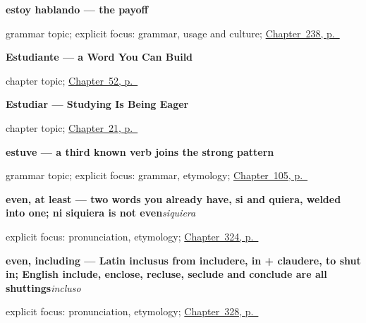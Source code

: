 \noindent\begin{minipage}[t]{\linewidth}
\raggedright
\textbf{estoy hablando — the payoff}\par
\footnotesize grammar topic; explicit focus: grammar, usage and culture; \hyperref[ch:estoy-hablando]{Chapter~238, p.~\pageref*{ch:estoy-hablando}}
\end{minipage}\par\smallskip

\noindent\begin{minipage}[t]{\linewidth}
\raggedright
\textbf{Estudiante --- a Word You Can Build}\par
\footnotesize chapter topic; \hyperref[ch:estudiante]{Chapter~52, p.~\pageref*{ch:estudiante}}
\end{minipage}\par\smallskip

\noindent\begin{minipage}[t]{\linewidth}
\raggedright
\textbf{Estudiar --- Studying Is Being Eager}\par
\footnotesize chapter topic; \hyperref[ch:spanish-estudiar]{Chapter~21, p.~\pageref*{ch:spanish-estudiar}}
\end{minipage}\par\smallskip

\noindent\begin{minipage}[t]{\linewidth}
\raggedright
\textbf{estuve — a third known verb joins the strong pattern}\par
\footnotesize grammar topic; explicit focus: grammar, etymology; \hyperref[ch:spanish-preterito-fuerte]{Chapter~105, p.~\pageref*{ch:spanish-preterito-fuerte}}
\end{minipage}\par\smallskip

\noindent\begin{minipage}[t]{\linewidth}
\raggedright
\textbf{even, at least — two words you already have, si and quiera, welded into one; ni siquiera is not even}\enspace\emph{siquiera}\par
\footnotesize explicit focus: pronunciation, etymology; \hyperref[ch:verdad-y-siquiera]{Chapter~324, p.~\pageref*{ch:verdad-y-siquiera}}
\end{minipage}\par\smallskip

\noindent\begin{minipage}[t]{\linewidth}
\raggedright
\textbf{even, including — Latin inclusus from includere, in + claudere, to shut in; English include, enclose, recluse, seclude and conclude are all shuttings}\enspace\emph{incluso}\par
\footnotesize explicit focus: pronunciation, etymology; \hyperref[ch:asi-y-incluso]{Chapter~328, p.~\pageref*{ch:asi-y-incluso}}
\end{minipage}\par\smallskip

